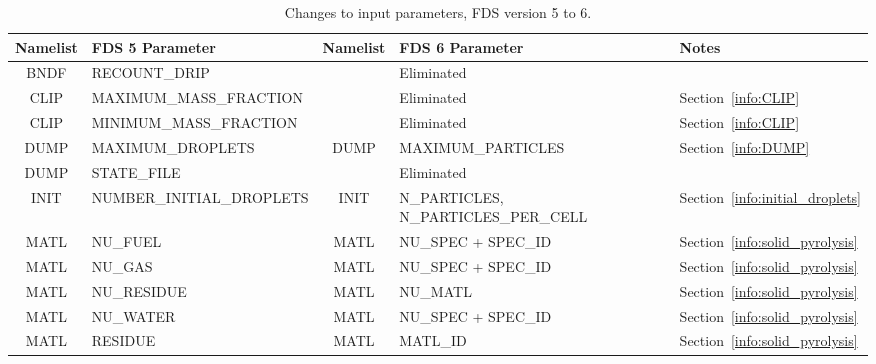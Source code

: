 \documentclass[11pt]{book}
\begin{document}
\begin{table}
\caption[List of changes to input parameters for FDS 6]{Changes to input parameters, FDS version 5 to 6.}
\label{tbl:Changes}
\centering
\begin{tabular}{@{\extracolsep{\fill}}|c|l|c|l|l|}
\hline
Namelist  & FDS 5 Parameter & Namelist  & FDS 6 Parameter & Notes \\ \hline \hline
{\ct BNDF}    & {\ct RECOUNT\_DRIP}                 &              & Eliminated                                  &                                              \\ \hline
{\ct CLIP}    & {\ct MAXIMUM\_MASS\_FRACTION}       &              & Eliminated                                  & Section~\ref{info:CLIP}                      \\ \hline
{\ct CLIP}    & {\ct MINIMUM\_MASS\_FRACTION}       &              & Eliminated                                  &  Section~\ref{info:CLIP}                     \\ \hline
{\ct DUMP}    & {\ct MAXIMUM\_DROPLETS}             &  {\ct DUMP}  &  {\ct MAXIMUM\_PARTICLES}                   &  Section~\ref{info:DUMP}                  \\ \hline
{\ct DUMP}    & {\ct STATE\_FILE}                   &              & Eliminated                                  &                                              \\ \hline
{\ct INIT}    & {\ct NUMBER\_INITIAL\_DROPLETS}     &  {\ct INIT}  &  {\ct N\_PARTICLES},  {\ct N\_PARTICLES\_PER\_CELL} &  Section~\ref{info:initial_droplets}                  \\ \hline
{\ct MATL}    & {\ct NU\_FUEL}                      &  {\ct MATL}  & {\ct NU\_SPEC} +  {\ct SPEC\_ID}            & Section~\ref{info:solid_pyrolysis}       \\ \hline
{\ct MATL}    & {\ct NU\_GAS}                       &  {\ct MATL}  & {\ct NU\_SPEC} +  {\ct SPEC\_ID}            & Section~\ref{info:solid_pyrolysis}       \\ \hline
{\ct MATL}    & {\ct NU\_RESIDUE}                   &  {\ct MATL}  & {\ct NU\_MATL}                              & Section~\ref{info:solid_pyrolysis}       \\ \hline
{\ct MATL}    & {\ct NU\_WATER}                     &  {\ct MATL}  & {\ct NU\_SPEC} +  {\ct SPEC\_ID}            & Section~\ref{info:solid_pyrolysis}       \\ \hline
{\ct MATL}    & {\ct RESIDUE}                       &  {\ct MATL}  & {\ct MATL\_ID}                              & Section~\ref{info:solid_pyrolysis}       \\ \hline

\end{tabular}
\end{table}
\end{document}
